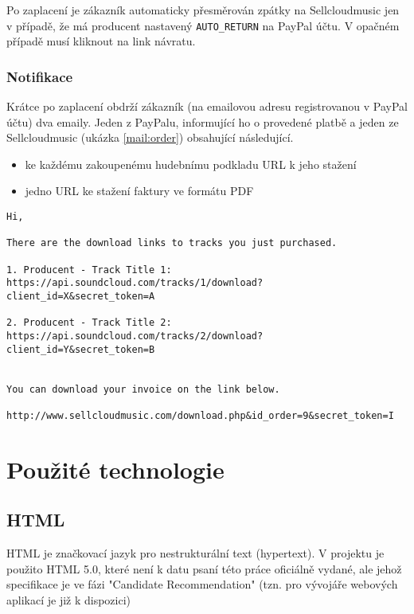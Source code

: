 \documentclass[12pt]{article}
\begin{document}
Po zaplacení je zákazník automaticky přesměrován zpátky na Sellcloudmusic jen v případě, že má producent nastavený \texttt{AUTO\_RETURN} na PayPal účtu. V opačném případě musí kliknout na link návratu.

\subsubsection{Notifikace}
Krátce po zaplacení obdrží zákazník (na emailovou adresu registrovanou v PayPal účtu) dva emaily. Jeden z PayPalu, informující ho o provedené platbě a jeden ze Sellcloudmusic (ukázka \ref{mail:order}) obsahující následující.
\begin{itemize}
\item ke každému zakoupenému hudebnímu podkladu URL k jeho stažení
\item jedno URL ke stažení faktury ve formátu PDF
\end{itemize}

\lstset{language=HTML}
\begin{lstlisting}[caption={Email při úspěšně dokončené objednávce},label={mail:order}]
Hi,

There are the download links to tracks you just purchased.

1. Producent - Track Title 1:
https://api.soundcloud.com/tracks/1/download?client_id=X&secret_token=A

2. Producent - Track Title 2:
https://api.soundcloud.com/tracks/2/download?client_id=Y&secret_token=B


You can download your invoice on the link below.

http://www.sellcloudmusic.com/download.php&id_order=9&secret_token=I
\end{lstlisting}

\newpage
\section{Použité technologie}

\subsection{HTML}
HTML je značkovací jazyk pro nestrukturální text (hypertext). V projektu je použito HTML 5.0, které není k datu psaní této práce oficiálně vydané, ale jehož specifikace je ve fázi "Candidate Recommendation" (tzn. pro vývojáře webových aplikací je již k dispozici)\cite{w3cHTML5}
\end{document}
